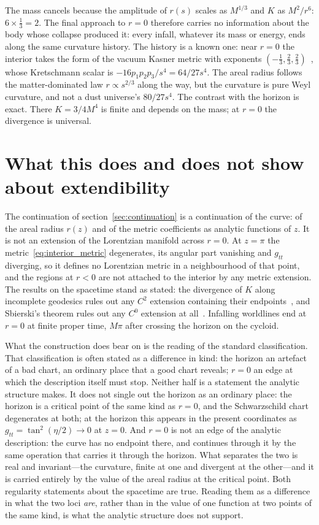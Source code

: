 \documentclass{iopjournal}
\theoremstyle{plain}
\theoremstyle{remark}
\begin{document}
The mass cancels because the amplitude of $r(s)$ scales as $M^{1/3}$ and $K$ as $M^{2}/r^{6}$: $6\times\tfrac13=2$. The final approach to $r=0$ therefore carries no information about the body whose collapse produced it: every infall, whatever its mass or energy, ends along the same curvature history. The history is a known one: near $r=0$ the interior takes the form of the vacuum Kasner metric with exponents $(-\tfrac13,\tfrac23,\tfrac23)$~\cite{Kasner1921}, whose Kretschmann scalar is $-16p_{1}p_{2}p_{3}/s^{4}=64/27s^{4}$. The areal radius follows the matter-dominated law $r\propto s^{2/3}$ along the way, but the curvature is pure Weyl curvature, and not a dust universe's $80/27s^{4}$. The contrast with the horizon is exact. There $K=3/4M^{4}$ is finite and depends on the mass; at $r=0$ the divergence is universal.

\section{What this does and does not show about extendibility}\label{sec:extendibility}

The continuation of section~\ref{sec:continuation} is a continuation of the curve: of the areal radius $r(z)$ and of the metric coefficients as analytic functions of $z$. It is not an extension of the Lorentzian manifold across $r=0$. At $z=\pi$ the metric~\eqref{eq:interior_metric} degenerates, its angular part vanishing and $g_{tt}$ diverging, so it defines no Lorentzian metric in a neighbourhood of that point, and the regions at $r<0$ are not attached to the interior by any metric extension. The results on the spacetime stand as stated: the divergence of $K$ along incomplete geodesics rules out any $C^{2}$ extension containing their endpoints~\cite{Hawking1973,Wald1984}, and Sbierski's theorem rules out any $C^{0}$ extension at all~\cite{sbierski2018}. Infalling worldlines end at $r=0$ at finite proper time, $M\pi$ after crossing the horizon on the cycloid.

What the construction does bear on is the reading of the standard classification. That classification is often stated as a difference in kind: the horizon an artefact of a bad chart, an ordinary place that a good chart reveals; $r=0$ an edge at which the description itself must stop. Neither half is a statement the analytic structure makes. It does not single out the horizon as an ordinary place: the horizon is a critical point of the same kind as $r=0$, and the Schwarzschild chart degenerates at both; at the horizon this appears in the present coordinates as $g_{tt}=\tan^{2}(\eta/2)\to0$ at $z=0$. And $r=0$ is not an edge of the analytic description: the curve has no endpoint there, and continues through it by the same operation that carries it through the horizon. What separates the two is real and invariant---the curvature, finite at one and divergent at the other---and it is carried entirely by the value of the areal radius at the critical point. Both regularity statements about the spacetime are true. Reading them as a difference in what the two loci \emph{are}, rather than in the value of one function at two points of the same kind, is what the analytic structure does not support.
\end{document}

